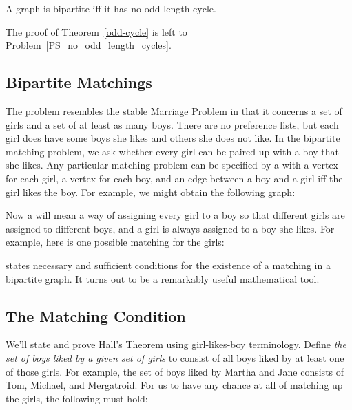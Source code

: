 {\begin{theorem}\label{odd-cycle}
A graph is bipartite iff it has no odd-length cycle.
\end{theorem}}
The proof of Theorem~\ref{odd-cycle} is left to
Problem~\ref{PS_no_odd_length_cycles}.

\subsection{Bipartite Matchings}

The  problem resembles the stable Marriage
Problem in that it concerns a set of girls and a set of at least as many
boys.  There are no preference lists, but each girl does have some boys
she likes and others she does not like.  In the bipartite matching
problem, we ask whether every girl can be paired up with a boy that she
likes.  Any particular matching problem can be specified by a
 with a vertex for each girl, a vertex for each boy,
and an edge between a boy and a girl iff the girl likes the boy.  For
example, we might obtain the following graph:


Now a  will mean a way of assigning every girl to a boy so
that different girls are assigned to different boys, and a girl is always
assigned to a boy she likes.  For example, here is one possible matching
for the girls:


 states necessary and sufficient conditions
for the existence of a matching in a bipartite graph.  It turns out to be
a remarkably useful mathematical tool.  

\subsection{The Matching Condition}

We'll state and prove Hall's Theorem using girl-likes-boy terminology.
Define \emph{the set of boys liked by a given set of girls} to consist of
all boys liked by at least one of those girls.  For example, the set of
boys liked by Martha and Jane consists of Tom, Michael, and Mergatroid.
For us to have any chance at all of matching up the girls, the following
 must hold:

